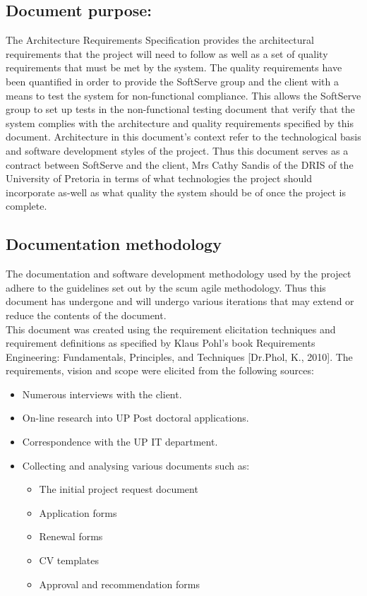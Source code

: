 \documentclass[12pt]{article}
\begin{document}
\subsection{Document purpose:}
\vspace{0.2in}
The Architecture Requirements Specification provides the architectural requirements that the project will need to follow as well as a set of quality requirements that must be met by the system. The quality requirements have been quantified in order to provide the SoftServe group and the client with a means to test the system for non-functional compliance. This allows the SoftServe group to set up tests in the non-functional testing document that verify that the system complies with the architecture and quality requirements specified by this document. Architecture in this document's context refer to the technological basis and software development styles of the project. Thus this document serves as a contract between SoftServe and the client, Mrs Cathy Sandis of the DRIS of the University of Pretoria in terms of what technologies the project should incorporate as-well as what quality the system should be of once the project is complete.

\vspace{0.2in}

\subsection{Documentation methodology}
\vspace{0.2in}
\begin{flushleft}
The documentation and software development methodology used by the project adhere to the guidelines set out by the scum agile methodology. Thus this document has undergone and will undergo various iterations that may extend or reduce the contents of the document.\\

This document was created using the requirement elicitation techniques and requirement definitions as specified by Klaus Pohl’s book Requirements Engineering: Fundamentals, Principles, and Techniques [Dr.Phol, K., 2010].
The requirements, vision and scope were elicited from the following sources:
\begin{itemize}
	\item Numerous interviews with the client.
	\item On-line research into UP Post doctoral applications.
	\item Correspondence with the UP IT department.
	\item Collecting and analysing various documents such as:
		\begin{itemize}
			\item The initial project request document
			\item Application forms
			\item Renewal forms
			\item CV templates
			\item Approval and recommendation forms
		\end{itemize}
\end{itemize}
\end{flushleft}	
\end{document}
